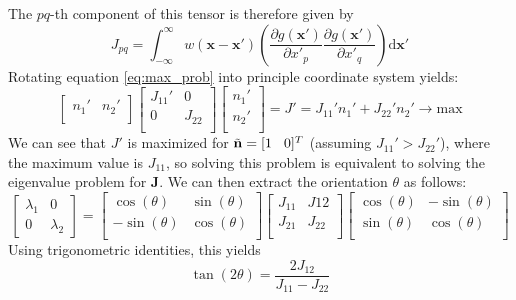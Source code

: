 		The $pq$-th component of this tensor is therefore given by
		\begin{equation}
			J_{pq} = \int_{-\infty}^{\infty} w(\mathbf{x} - \mathbf{x'}) 
							\left(
								\dfrac{\partial g(\mathbf{x'})}{\partial x'_p} \dfrac{\partial g(\mathbf{x'})}{\partial x'_q}
							\right)
							\text{d} \mathbf{x'}
			\label{eq:struct_tensor_pq}
		\end{equation}
		Rotating equation \ref{eq:max_prob} into principle coordinate system yields:
		\begin{equation}
				\begin{bmatrix}
    					 n_1' & n_2' \\
				\end{bmatrix}
				\begin{bmatrix}
    					 J_{11}' & 0 \\
    				  0 & J_{22} \\
				\end{bmatrix}
				\begin{bmatrix}
    					 n_1' \\
    				   n_2' \\
				\end{bmatrix}
				=
				J' = J_{11}'n_1' + J_{22}'n_2' \rightarrow \text{max}
		\end{equation}					
		We can see that $J'$ is maximized for $\tilde{\mathbf{n}} = [1 \hspace{0.3cm} 0]^T$ (assuming $J_{11}' > J_{22}'$), where the maximum value is $J_{11}$, so solving this problem is equivalent to solving the eigenvalue problem for $\mathbf{J}$. We can then extract the orientation $\theta$ as follows:
		\begin{equation}
			\begin{bmatrix}
    					 \lambda_1 & 0 \\
    					 0		& \lambda_2
				\end{bmatrix}
				=
				\begin{bmatrix}
    					 \cos(\theta) & \sin(\theta) \\
    				  	-\sin(\theta) & \cos(\theta) \\
				\end{bmatrix}
				\begin{bmatrix}
    					 J_{11} & J{12} \\
    				  J_{21} & J_{22} \\
				\end{bmatrix}
				\begin{bmatrix}
    					 \cos(\theta) & -\sin(\theta) \\
    				  	\sin(\theta) & \cos(\theta) \\
				\end{bmatrix}
		\end{equation}
		Using trigonometric identities, this yields 
		\begin{equation}
			\tan(2\theta) = \dfrac{2 J_{12}}{J_{11} - J_{22}}
		\end{equation}
		
